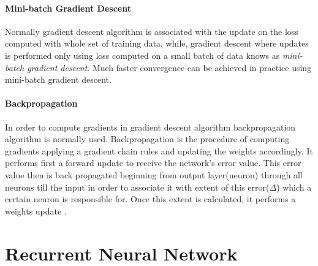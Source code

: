 \paragraph{Mini-batch Gradient Descent} Normally gradient descent algorithm
is associated with the update on the loss computed with whole set of training data,
while, gradient descent where updates is performed only using loss computed
on a small batch of data knows as \emph{mini-batch gradient descent}.
Much faster convergence can be achieved in practice using mini-batch gradient descent.
\cite{KarpathyAndrej2016}













\paragraph{Backpropagation} In order to compute gradients in gradient descent algorithm
backpropagation algorithm is normally used. Backpropagation is the procedure of computing
gradients applying a gradient chain rules and updating the weights accordingly.
It performs first a forward update to receive the network's error value. This error
value then is back propagated beginning from output layer(neuron) through all neurons
till the input in order to associate it with extent of this error($\Delta$)
which a certain neuron is responsible
for. Once this extent is calculated, it performs a weights update \cite{Rumelhart1986}.


\section{Recurrent Neural Network} \label{sec:rec_NN}

